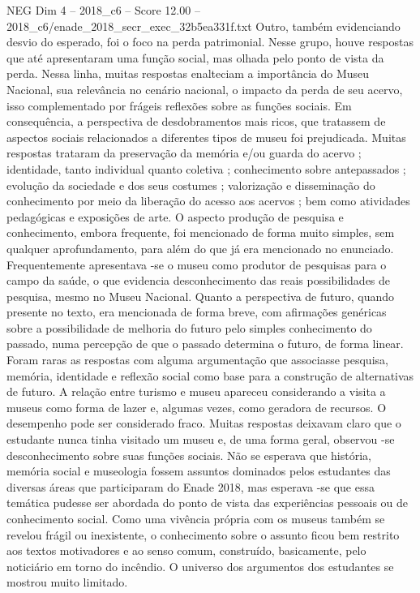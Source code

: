 \begin{textsample}{NEG Dim 4 – 2018\_c6 – Score 12.00 – 2018\_c6/enade\_2018\_secr\_exec\_32b5ea331f.txt}
Outro, também evidenciando desvio do esperado, foi o foco na perda patrimonial.
Nesse grupo, houve respostas que até apresentaram uma função social, mas olhada pelo ponto de vista da perda.
Nessa linha, muitas respostas enalteciam a importância do Museu Nacional, sua relevância no cenário nacional, o impacto da perda de seu acervo, isso complementado por frágeis reflexões sobre as funções sociais.
Em consequência, a perspectiva de desdobramentos mais ricos, que tratassem de aspectos sociais relacionados a diferentes tipos de museu foi prejudicada.
Muitas respostas trataram da preservação da memória e/ou guarda do acervo ; identidade, tanto individual quanto coletiva ; conhecimento sobre antepassados ; evolução da sociedade e dos seus costumes ; valorização e disseminação do conhecimento por meio da liberação do acesso aos acervos ; bem como atividades pedagógicas e exposições de arte.
O aspecto produção de pesquisa e conhecimento, embora frequente, foi mencionado de forma muito simples, sem qualquer aprofundamento, para além do que já era mencionado no enunciado.
Frequentemente apresentava -se o museu como produtor de pesquisas para o campo da saúde, o que evidencia desconhecimento das reais possibilidades de pesquisa, mesmo no Museu Nacional.
Quanto a perspectiva de futuro, quando presente no texto, era mencionada de forma breve, com afirmações genéricas sobre a possibilidade de melhoria do futuro pelo simples conhecimento do passado, numa percepção de que o passado determina o futuro, de forma linear.
Foram raras as respostas com alguma argumentação que associasse pesquisa, memória, identidade e reflexão social como base para a construção de alternativas de futuro.
A relação entre turismo e museu apareceu considerando a visita a museus como forma de lazer e, algumas vezes, como geradora de recursos.
O desempenho pode ser considerado fraco.
Muitas respostas deixavam claro que o estudante nunca tinha visitado um museu e, de uma forma geral, observou -se desconhecimento sobre suas funções sociais.
Não se esperava que história, memória social e museologia fossem assuntos dominados pelos estudantes das diversas áreas que participaram do Enade 2018, mas esperava -se que essa temática pudesse ser abordada do ponto de vista das experiências pessoais ou de conhecimento social.
Como uma vivência própria com os museus também se revelou frágil ou inexistente, o conhecimento sobre o assunto ficou bem restrito aos textos motivadores e ao senso comum, construído, basicamente, pelo noticiário em torno do incêndio.
O universo dos argumentos dos estudantes se mostrou muito limitado.

\end{textsample}
